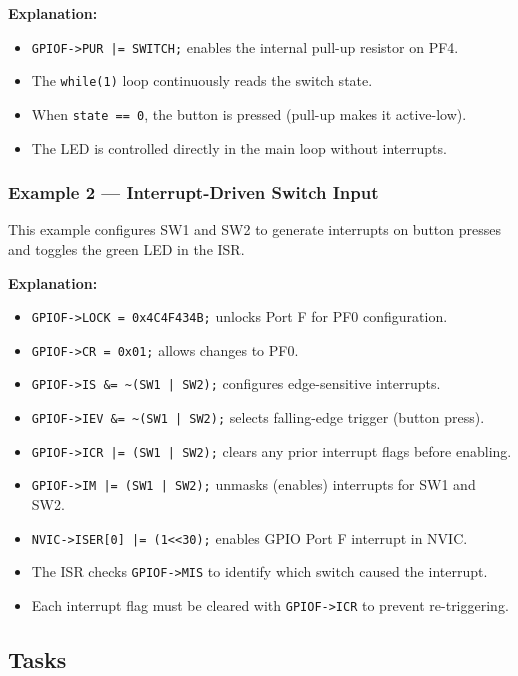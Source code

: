 \noindent
\textbf{Explanation:}
\begin{itemize}[nosep]
  \item \texttt{GPIOF->PUR |= SWITCH;} enables the internal pull-up resistor on PF4.
  \item The \texttt{while(1)} loop continuously reads the switch state.
  \item When \texttt{state == 0}, the button is pressed (pull-up makes it active-low).
  \item The LED is controlled directly in the main loop without interrupts.
\end{itemize}
\newpage
\subsubsection{Example 2 — Interrupt-Driven Switch Input}

This example configures SW1 and SW2 to generate interrupts on button presses and toggles the green LED in the ISR.



\noindent
\textbf{Explanation:}
\begin{itemize}[nosep]
  \item \texttt{GPIOF->LOCK = 0x4C4F434B;} unlocks Port F for PF0 configuration.
  \item \texttt{GPIOF->CR = 0x01;} allows changes to PF0.
  \item \texttt{GPIOF->IS \&= \textasciitilde(SW1 | SW2);} configures edge-sensitive interrupts.
  \item \texttt{GPIOF->IEV \&= \textasciitilde(SW1 | SW2);} selects falling-edge trigger (button press).
  \item \texttt{GPIOF->ICR |= (SW1 | SW2);} clears any prior interrupt flags before enabling.
  \item \texttt{GPIOF->IM |= (SW1 | SW2);} unmasks (enables) interrupts for SW1 and SW2.
  \item \texttt{NVIC->ISER[0] |= (1<<30);} enables GPIO Port F interrupt in NVIC.
  \item The ISR checks \texttt{GPIOF->MIS} to identify which switch caused the interrupt.
  \item Each interrupt flag must be cleared with \texttt{GPIOF->ICR} to prevent re-triggering.
\end{itemize}
\newpage
\subsection{Tasks}


